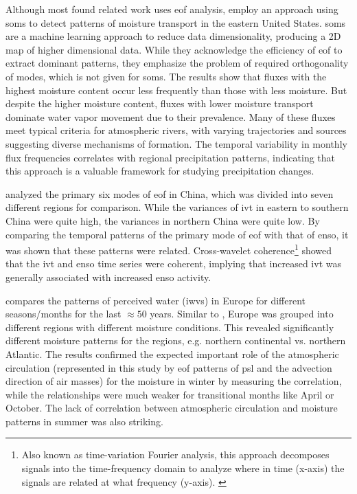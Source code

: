 Although most found related work uses \ac{eof} analysis, \citeauthor{teale_patterns_2020} employ an approach using \acp{som} to detect patterns of moisture transport in the eastern United States.
\acp{som} are a machine learning approach to reduce data dimensionality, producing a 2D map of higher dimensional data.
While they acknowledge the efficiency of \ac{eof} to extract dominant patterns, they emphasize the problem of required orthogonality of modes, which is not given for \acp{som}. 
The results show that fluxes with the highest moisture content occur less frequently than those with less moisture. 
But despite the higher moisture content, fluxes with lower moisture transport dominate water vapor movement due to their prevalence. 
Many of these fluxes meet typical criteria for atmospheric rivers, with varying trajectories and sources suggesting diverse mechanisms of formation. 
The temporal variability in monthly flux frequencies correlates with regional precipitation patterns, indicating that this approach is a valuable framework for studying precipitation changes. \cite{teale_patterns_2020}



\citeauthor{ayantobo_integrated_2022} analyzed the primary six modes of \ac{eof} in China, which was divided into seven different regions for comparison. 
While the variances of \ac{ivt} in eastern to southern China were quite high, the variances in northern China were quite low. 
By comparing the temporal patterns of the primary mode of \ac{eof} with that of \ac{enso}, it was shown that these patterns were related. 
Cross-wavelet coherence\footnote{Also known as time-variation Fourier analysis, this approach decomposes signals into the time-frequency domain to analyze where in time (x-axis) the signals are related at what frequency (y-axis). \cite{ayantobo_integrated_2022}} showed that the \ac{ivt} and \ac{enso} time series were coherent, implying that increased \ac{ivt} was generally associated with increased \ac{enso} activity. \cite{ayantobo_integrated_2022} 


\cite{wypych_atmospheric_2018} compares the patterns of perceived water (\acp{iwv}) in Europe for different seasons/months for the last $\approx50$ years. 
Similar to \cite{ayantobo_integrated_2022}, Europe was grouped into different regions with different moisture conditions. 
This revealed significantly different moisture patterns for the regions, e.g. northern continental vs. northern Atlantic.
The results confirmed the expected important role of the atmospheric circulation (represented in this study by \ac{eof} patterns of \ac{psl} and the advection direction of air masses) for the moisture in winter by measuring the correlation, while the relationships were much weaker for transitional months like April or October. 
The lack of correlation between atmospheric circulation and moisture patterns in summer was also striking. \cite{wypych_atmospheric_2018}


